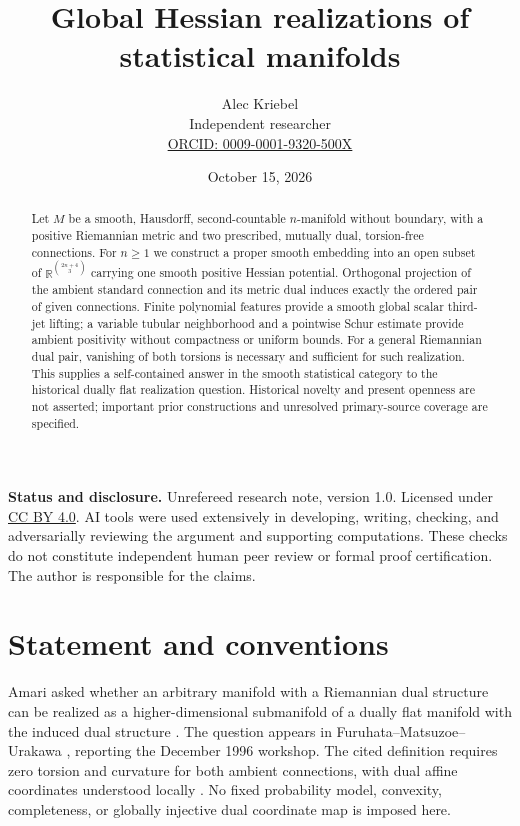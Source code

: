 \documentclass[10pt,letterpaper]{article}
\title{Global Hessian realizations of statistical manifolds}
\author{Alec Kriebel\\\small Independent researcher\\
\small\href{https://orcid.org/0009-0001-9320-500X}{ORCID: 0009-0001-9320-500X}}
\date{October 15, 2026}
\newcommand{\R}{\mathbb R}
\begin{document}
\maketitle
\begin{abstract}
Let $M$ be a smooth, Hausdorff, second-countable $n$-manifold without
boundary, with a positive Riemannian metric and two prescribed, mutually
dual, torsion-free connections. For $n\geq1$ we construct a proper smooth
embedding into an open subset of $\R^{\binom{2n+4}{3}}$ carrying one smooth
positive Hessian potential. Orthogonal projection of the ambient standard
connection and its metric dual induces exactly the ordered pair of given
connections. Finite polynomial features provide a smooth global scalar
third-jet lifting; a variable tubular neighborhood and a pointwise Schur
estimate provide ambient positivity without compactness or uniform bounds.
For a general Riemannian dual pair, vanishing of both torsions is necessary
and sufficient for such realization. This supplies a self-contained answer
in the smooth statistical category to the historical dually flat realization
question. Historical novelty and present openness are not asserted; important
prior constructions and unresolved primary-source coverage are specified.
\end{abstract}
\noindent\textbf{Status and disclosure.}
Unrefereed research note, version 1.0. Licensed under
\href{https://creativecommons.org/licenses/by/4.0/}{CC BY 4.0}. AI tools were used extensively in developing,
writing, checking, and adversarially reviewing the argument and supporting
computations. These checks do not constitute independent human peer review
or formal proof certification. The author is responsible for the claims.

\section{Statement and conventions}

Amari asked whether an arbitrary manifold with a Riemannian dual structure
can be realized as a higher-dimensional submanifold of a dually flat
manifold with the induced dual structure \cite[p.~87, question~1]{Amari}.
The question appears in Furuhata--Matsuzoe--Urakawa
\cite[p.~125, item~1(a)]{FMU}, reporting the December 1996 workshop.
The cited definition requires zero torsion and curvature for both ambient
connections, with dual affine coordinates understood locally
\cite[pp.~84--85]{Amari}. No fixed probability model, convexity, completeness,
or globally injective dual coordinate map is imposed here.
\end{document}
